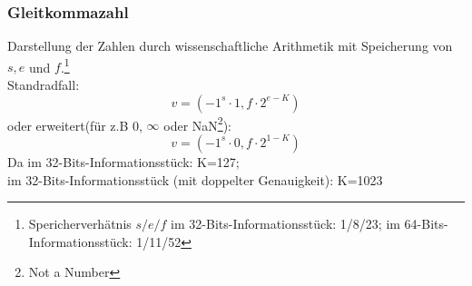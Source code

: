 \documentclass{article}
\begin{document}
    \subsubsection*{Gleitkommazahl}
    Darstellung der Zahlen durch wissenschaftliche Arithmetik mit Speicherung von $s, e $ und $ f$.\footnote{Spericherverhätnis $s/e/f$ im 32-Bits-Informationsstück: 1/8/23; im 64-Bits-Informationsstück: 1/11/52}\\
    Standradfall:
    $$v=(-1^s\cdot1,f\cdot2^{e-K})$$
    oder erweitert(für z.B 0, $\infty$ oder NaN\footnote{Not a Number}):$$v=(-1^s\cdot0,f\cdot2^{1-K})$$
    Da im 32-Bits-Informationsstück: K=127;\\ im 32-Bits-Informationsstück (mit doppelter Genauigkeit): K=1023
    
\end{document}
